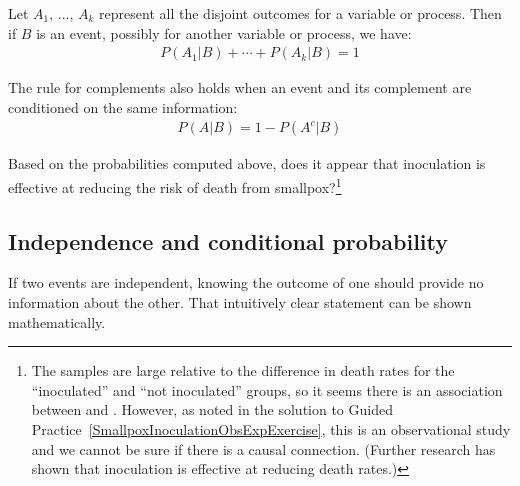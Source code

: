 \begin{doublespace}
\begin{termBox}{
Let $A_1$, ..., $A_k$ represent all the disjoint outcomes for a variable or process. Then if $B$ is an event, possibly for another variable or process, we have: \vspace{-1mm}
\begin{eqnarray*}
P(A_1|B)+\cdots+P(A_k|B) = 1
\end{eqnarray*}\vspace{-5.5mm} \par
The rule for complements also holds when an event and its complement are conditioned on the same information: \vspace{-1.5mm}
\begin{eqnarray*}
P(A | B) = 1 - P(A^c | B)
\end{eqnarray*}}
\end{termBox}

\begin{exercise}
Based on the probabilities computed above, does it appear that inoculation is effective at reducing the risk of death from smallpox?\footnote{The samples are large relative to the difference in death rates for the ``inoculated'' and ``not inoculated'' groups, so it seems there is an association between  and . However, as noted in the solution to Guided Practice~\ref{SmallpoxInoculationObsExpExercise}, this is an observational study and we cannot be sure if there is a causal connection. (Further research has shown that inoculation is effective at reducing death rates.)}
\end{exercise}


\subsection{Independence and conditional probability}

If two events are independent, knowing the outcome of one should provide no information about the other.  That intuitively clear statement can be shown mathematically. 


\end{doublespace}
